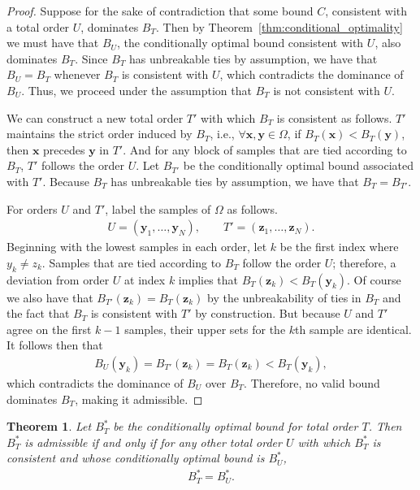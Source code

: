 \documentclass{article}
\newtheorem{theorem}{Theorem}[section]
\theoremstyle{definition}
\theoremstyle{remark}
\newcounter{assumption}%
\newcommand{\z}{\mathbf{z}}
\newcommand{\y}{\mathbf{y}}
\def\y{\mathbf{y}}
\def\x{\mathbf{x}}
\begin{document}
\begin{proof}
    Suppose for the sake of contradiction that some bound $C$, consistent with a total order $U$, dominates $B_T$. Then by Theorem~\ref{thm:conditional_optimality} we must have that $B_U$, the conditionally optimal bound consistent with $U$, also dominates $B_T$. Since $B_T$ has unbreakable ties by assumption, we have that $B_U  = B_T$ whenever $B_T$ is consistent with $U$, which contradicts the dominance of $B_U$. Thus, we proceed under the assumption that $B_T$ is not consistent with $U$.

    We can construct a new total order $T'$ with which $B_T$ is consistent as follows. $T'$ maintains the strict order induced by $B_T$, i.e., $\forall \x, \y \in \Omega$, if $B_T(\x) < B_T(\y)$, then $\x$ precedes $\y$ in $T'$. And for any block of samples that are tied according to $B_T$, $T'$ follows the order $U$. Let $B_{T'}$ be the conditionally optimal bound associated with $T'$.  Because $B_T$ has unbreakable ties by assumption, we have that $B_T = B_{T'}$.
    
    For orders $U$ and $T'$, label the samples of $\Omega$ as follows.
    \begin{eqnarray}
        U = (\y_1, \ldots, \y_N), \qquad T' = (\z_1, \ldots, \z_N).
    \end{eqnarray}
    Beginning with the lowest samples in each order, let $k$ be the first index where $y_k \neq z_k$. Samples that are tied according to $B_T$ follow the order $U$; therefore, a deviation from order $U$ at index $k$ implies that $B_T(\z_k) < B_T(\y_k)$. Of course we also have that $B_{T'}(\z_k) = B_T(\z_k)$ by the unbreakability of ties in $B_T$ and the fact that $B_T$ is consistent with $T'$ by construction. But because $U$ and $T'$ agree on the first $k-1$ samples, their upper sets for the $k$th sample are identical. It follows then that
    \begin{eqnarray}
        B_U(\y_k) = B_{T'}(\z_k) = B_T(\z_k) < B_T(\y_k),
    \end{eqnarray}
    which contradicts the dominance of $B_U$ over $B_T$. Therefore, no valid bound dominates $B_T$, making it admissible.
\end{proof}

\begin{theorem}
\label{thm:admissibility_characterization}
    Let $B^*_T$ be the conditionally optimal bound for total order $T$. Then $B^*_T$ is admissible if and only if for any other total order $U$ with which $B_T^*$ is consistent and whose conditionally optimal bound is $B_U^*$,
    \begin{eqnarray}
        B^*_T = B^*_U.
    \end{eqnarray}
\end{theorem}
\end{document}

